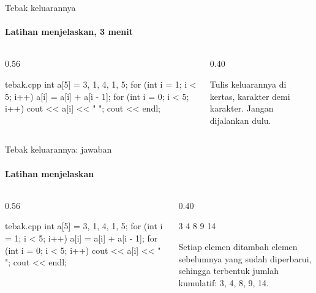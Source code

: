\documentclass[t]{beamer}
\begin{document}
\begin{frame}[fragile]{Tebak keluarannya}
\framesubtitle{Latihan menjelaskan, 3 menit}
\begin{columns}[T]
\begin{column}{0.56\textwidth}
\begin{Kode}[]{tebak.cpp}
int a[5] = {3, 1, 4, 1, 5};
for (int i = 1; i < 5; i++) {
    a[i] = a[i] + a[i - 1];
}
for (int i = 0; i < 5; i++) {
    cout << a[i] << " ";
}
cout << endl;
\end{Kode}
\end{column}
\begin{column}{0.40\textwidth}
\begin{Catatan}
Tulis keluarannya di kertas, karakter demi karakter. Jangan dijalankan dulu.
\end{Catatan}
\end{column}
\end{columns}
\end{frame}

\begin{frame}[fragile]{Tebak keluarannya: jawaban}
\framesubtitle{Latihan menjelaskan}
\begin{columns}[T]
\begin{column}{0.56\textwidth}
\begin{Kode}[]{tebak.cpp}
int a[5] = {3, 1, 4, 1, 5};
for (int i = 1; i < 5; i++) {
    a[i] = a[i] + a[i - 1];
}
for (int i = 0; i < 5; i++) {
    cout << a[i] << " ";
}
cout << endl;
\end{Kode}
\end{column}
\begin{column}{0.40\textwidth}
\begin{Keluaran}[]
3 4 8 9 14 
\end{Keluaran}
\begin{Catatan}
Setiap elemen ditambah elemen sebelumnya yang sudah diperbarui, sehingga terbentuk jumlah kumulatif: 3, 4, 8, 9, 14.
\end{Catatan}
\end{column}
\end{columns}
\end{frame}
\end{document}
